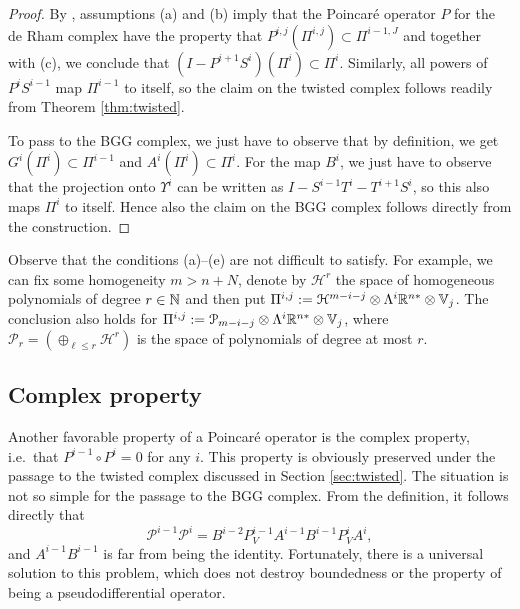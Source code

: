 \documentclass[11pt]{amsart}
\newcommand{\0}{\mathaccent23}
\begin{document}
\begin{proof}
  By  \cite{costabel2010bogovskiui}, assumptions (a) and (b) imply that the Poincar\'e operator $P$ for the de Rham complex have the property that $P^{i,j}(\Pi^{i,j})\subset\Pi^{i-1,J}$ and together with (c), we conclude that $(I-P^{i+1}S^i)(\Pi^i)\subset\Pi^i$. Similarly, all powers of $P^iS^{i-1}$ map $\Pi^{i-1}$ to itself, so the claim on the twisted complex follows readily from Theorem \ref{thm:twisted}.
  
  To pass to the BGG complex, we just have to observe that by definition, we get $G^i(\Pi^i)\subset\Pi^{i-1}$ and $A^i(\Pi^i)\subset\Pi^i$. For the map $B^i$, we just have to observe that the projection onto $\Upsilon^i$ can be written as $I-S^{i-1}T^i-T^{i+1}S^i$, so this also maps $\Pi^i$ to itself. Hence also the claim on the BGG complex follows directly from the construction. 
\end{proof}

Observe that the conditions (a)--(e) are not difficult to satisfy. For example, we can fix some homogeneity $m>n+N$, denote by $\mathcal H^r$ the space of homogeneous polynomials of degree $r\in\Bbb N$ and then put $\Pi^{i,j}:=\mathcal H^{m-i-j}\otimes\Lambda^i\Bbb R^{n*}\otimes\Bbb V_j$. The conclusion also holds for {$ \Pi^{i,j}:=\mathcal P_{m-i-j}\otimes\Lambda^i\Bbb R^{n*}\otimes\Bbb V_j$, where
  $\mathcal P_r=(\oplus_{\ell\leq r}\mathcal H^r)$ is the space of polynomials of degree at most $r$.}

\subsection{Complex property}\label{sec:complex-prop}
Another favorable property of a Poincar\'e operator is the complex property, i.e.\ that $P^{i-1}\circ P^i=0$ for any $i$. This property is obviously preserved under the passage to the twisted complex discussed in Section \ref{sec:twisted}. The situation is not so simple for the passage to the BGG complex. From the definition, it follows directly that
$$
\mathscr{P}^{i-1}\mathscr{P}^{i}=B^{i-2}P^{i-1}_{V} A^{i-1}B^{i-1}P^{i}_{V} A^{i},
$$
and $A^{i-1}B^{i-1}$ is far from being the identity. Fortunately, there is a universal solution to this problem, which does not destroy boundedness or the property of being a pseudodifferential operator.
\end{document}
